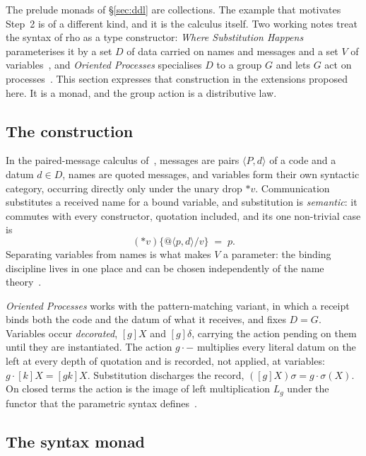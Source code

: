 \documentclass[11pt]{article}
\theoremstyle{branddef}
\theoremstyle{brandplain}
\theoremstyle{brandrem}
\newcommand{\rhoc}{\textsf{rho}}
\begin{document}
The prelude monads of \S\ref{sec:ddl} are collections. The example that
motivates Step~2 is of a different kind, and it is the calculus itself. Two
working notes treat the syntax of \rhoc{} as a type constructor: \emph{Where
Substitution Happens} parameterises it by a set \(D\) of data carried on names
and messages and a set \(V\) of variables~\cite{WSH}, and \emph{Oriented
Processes} specialises \(D\) to a group \(G\) and lets \(G\) act on
processes~\cite{Oriented}. This section expresses that construction in the
extensions proposed here. It is a monad, and the group action is a
distributive law.

\subsection{The construction}

In the paired-message calculus of~\cite{WSH}, messages are pairs
\(\langle P, d\rangle\) of a code and a datum \(d\in D\), names are quoted
messages, and variables form their own syntactic category, occurring directly
only under the unary drop \(\ast v\). Communication substitutes a received name
for a bound variable, and substitution is \emph{semantic}: it commutes with
every constructor, quotation included, and its one non-trivial case is
\[
(\ast v)\{@\langle p, d\rangle / v\} \;=\; p .
\]
Separating variables from names is what makes \(V\) a parameter: the binding
discipline lives in one place and can be chosen independently of the name
theory~\cite{WSH}.

\emph{Oriented Processes} works with the pattern-matching variant, in which a
receipt binds both the code and the datum of what it receives, and fixes
\(D=G\). Variables occur \emph{decorated}, \([g]X\) and \([g]\delta\),
carrying the action pending on them until they are instantiated. The action
\(g\cdot-\) multiplies every literal datum on the left at every depth of
quotation and is recorded, not applied, at variables:
\(g\cdot[k]X=[gk]X\). Substitution discharges the record,
\(([g]X)\sigma = g\cdot\sigma(X)\). On closed terms the action is the image of
left multiplication \(L_g\) under the functor that the parametric syntax
defines~\cite{Oriented}.

\subsection{The syntax monad}
\end{document}
